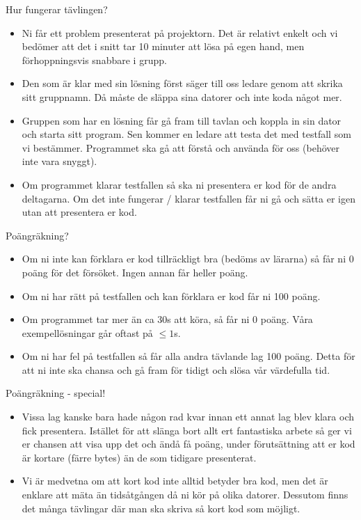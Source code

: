 \documentclass[10pt]{beamer}
\begin{document}
\begin{frame}[fragile]{Hur fungerar tävlingen?}

\begin{itemize}
\item Ni får ett problem presenterat på projektorn. Det är relativt enkelt och vi bedömer att det i snitt tar 10 minuter att lösa på egen hand, men förhoppningsvis snabbare i grupp. 
\item Den som är klar med sin lösning först säger till oss ledare genom att skrika sitt gruppnamn. Då måste de släppa sina datorer och inte koda något mer. 
\item Gruppen som har en lösning får gå fram till tavlan och koppla in sin dator och starta sitt program. Sen kommer en ledare att testa det med testfall som vi bestämmer. Programmet ska gå att förstå och använda för oss (behöver inte vara snyggt).
\item Om programmet klarar testfallen så ska ni presentera er kod för de andra deltagarna. Om det inte fungerar / klarar testfallen får ni gå och sätta er igen utan att presentera er kod. 
\end{itemize} 
\end{frame}




\begin{frame}[fragile]{Poängräkning?}

\begin{itemize}
\item Om ni inte kan förklara er kod tillräckligt bra (bedöms av lärarna) så får ni 0 poäng för det försöket. Ingen annan får heller poäng. 
\item Om ni har rätt på testfallen och kan förklara er kod får ni 100 poäng. 
\item Om programmet tar mer än ca 30s att köra, så får ni 0 poäng. Våra exempellösningar går oftast på $\le1$s.
\item Om ni har fel på testfallen så får alla andra tävlande lag 100 poäng. Detta för att ni inte ska chansa och gå fram för tidigt och slösa vår värdefulla tid. 
\end{itemize}
\end{frame}



\begin{frame}[fragile]{Poängräkning - special!}

\begin{itemize}
\item Vissa lag kanske bara hade någon rad kvar innan ett annat lag blev klara och fick presentera. Istället för att slänga bort allt ert fantastiska arbete så ger vi er chansen att visa upp det och ändå få poäng, under förutsättning att er kod är kortare (färre bytes) än de som tidigare presenterat. 
\item Vi är medvetna om att kort kod inte alltid betyder bra kod, men det är enklare att mäta än tidsåtgången då ni kör på olika datorer. Dessutom finns det många tävlingar där man ska skriva så kort kod som möjligt.
\end{itemize}

\end{frame}
\end{document}
